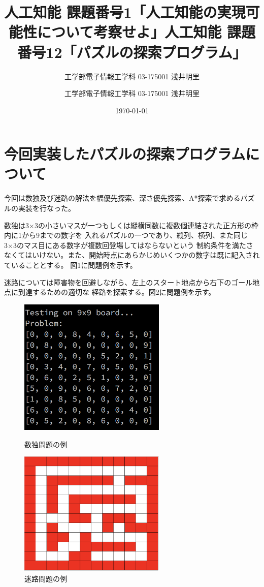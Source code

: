 \documentclass[uplatex]{jsarticle}
\title{人工知能 課題番号1「人工知能の実現可能性について考察せよ」}
\author{工学部電子情報工学科 03-175001 浅井明里}
\title{人工知能 課題番号12「パズルの探索プログラム」}
\author{工学部電子情報工学科 03-175001 浅井明里}
\date{\today}
\makeatletter
\def\maketitle{%
  \null
  \thispagestyle{empty}%
  \vfill
  \begin{center}\leavevmode
    \normalfont
    {\LARGE \@title\par}%
    \vskip 1cm
    {\Large \@author\par}%
    \vskip 1cm
    {\Large \@date\par}%
  \end{center}%
  \vfill
  \null
  \@thanks%
  \cleardoublepage
  }
\makeatother
\begin{document}
\maketitle

\section{今回実装したパズルの探索プログラムについて}
今回は数独及び迷路の解法を幅優先探索、深さ優先探索、A*探索で求めるパズルの実装を行なった。

数独は3×3の小さいマスが一つもしくは縦横同数に複数個連結された正方形の枠内に1から9までの数字を
入れるパズルの一つであり、縦列、横列、また同じ3×3のマス目にある数字が複数回登場してはならないという
制約条件を満たさなくてはいけない。また、開始時点にあらかじめいくつかの数字は既に記入されていることとする。
図1に問題例を示す。

迷路については障害物を回避しながら、左上のスタート地点から右下のゴール地点に到達するための適切な
経路を探索する。図2に問題例を示す。
\begin{figure}[htbp]
\begin{minipage}{0.5\hsize}
 \begin{center}
  \includegraphics[width=70mm]{img/sudoku.png}
 \end{center}
 \caption{数独問題の例}
 \label{fig:one}
\end{minipage}
\begin{minipage}{0.5\hsize}
 \begin{center}
  \includegraphics[width=70mm]{img/maze.png}
 \end{center}
 \caption{迷路問題の例}
 \label{fig:two}
\end{minipage}
\end{figure}
\end{document}
